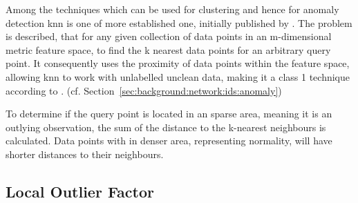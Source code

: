 Among the techniques which can be used for clustering and hence for anomaly detection \gls{knn} is one of more established one, initially published by \textcite{Fix1951}.
The problem is described, that for any given collection of data points in an m-dimensional metric feature space, to find the k nearest data points for an arbitrary query point. \parencite{Beyer1999}
It consequently uses the proximity of data points within the feature space, allowing \gls{knn} to work with unlabelled unclean data, making it a class 1 technique according to \textcite{Hodge2004}. (cf. Section~\ref{sec:background:network:ids:anomaly})

To determine if the query point is located in an sparse area, meaning it is an outlying observation, the sum of the distance to the k-nearest neighbours is calculated.
Data points with in denser area, representing normality, will have shorter distances to their neighbours. \parencite{Eskin2002}

\subsection{Local Outlier Factor}
\label{sec:background:network:novelty:lof}

